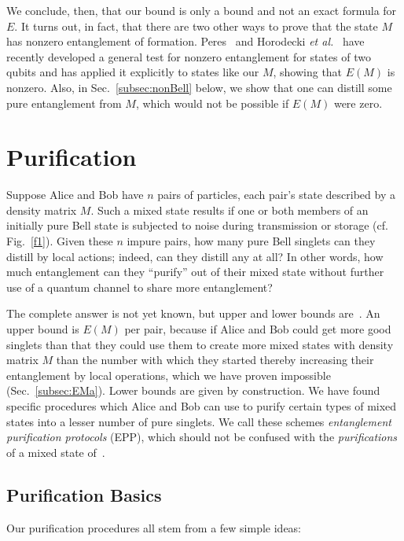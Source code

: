We conclude, then, that our bound is only a bound and not an
exact formula for $E$.  It turns out, in fact, that there are
two other ways to prove that the state $M$ has nonzero entanglement
of formation.  Peres~\cite{Peres2} and Horodecki 
{\em et al.}~\cite{horodecki} have recently developed a
general test for nonzero entanglement for states of two qubits and
has applied it explicitly to states like our $M$, showing that
$E(M)$ is nonzero.  Also, in Sec.~\ref{subsec:nonBell}
below, we show that one can distill some pure
entanglement from $M$, which would not be possible if $E(M)$
were zero.

\section{Purification}
\label{sec:D}
 
Suppose Alice and Bob have $n$ pairs of particles, each pair's state
described by a density matrix $M$.  Such a mixed state results if one or
both members of an initially pure Bell state is subjected to noise during
transmission or storage (cf. Fig.~\ref{f1}). Given these $n$ impure
pairs, how many pure Bell singlets can they distill by local actions;
indeed, can they distill any at all?  In other words, how much
entanglement can they ``purify'' out of their mixed state without
further use of a quantum channel to share more entanglement?
 
The complete answer is not yet known, but upper and lower bounds
are~\cite{purification}.  An upper bound is $E(M)$ per pair, because
if Alice and Bob could get more good singlets than that they could use
them to create more mixed states with density matrix $M$ than the
number with which they started thereby increasing their entanglement
by local operations, which we have proven impossible (Sec.~\ref{subsec:EMa}).
Lower bounds are given by construction.  We have found
specific procedures which Alice and Bob can use to purify certain
types of mixed states into a lesser number of pure singlets.  We call
these schemes {\em entanglement purification protocols} (EPP), which
should not be confused with the {\em purifications} of a mixed state
of~\cite{Jozsa}.
 
\subsection{Purification Basics}
\label{basics}
 
Our purification procedures all stem from a few simple ideas:
 
